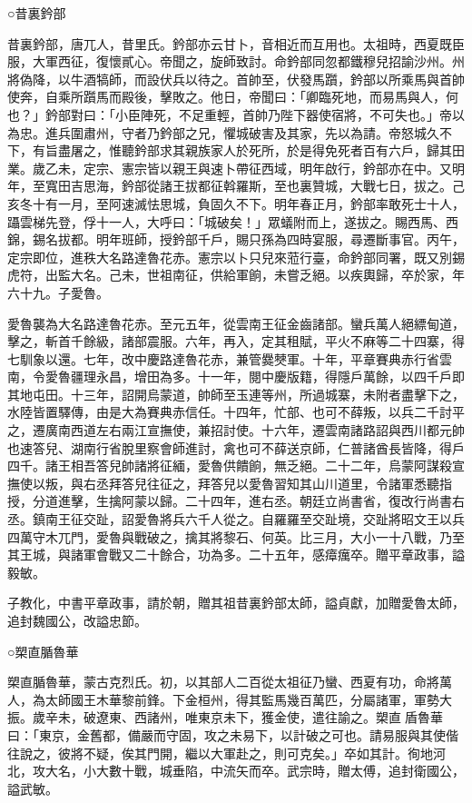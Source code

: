 \begin{pinyinscope}
 ○昔裏鈐部



 昔裏鈐部，唐兀人，昔里氏。鈐部亦云甘卜，音相近而互用也。太祖時，西夏既臣服，大軍西征，復懷貳心。帝聞之，旋師致討。命鈐部同忽都鐵穆兒招諭沙州。州將偽降，以牛酒犒師，而設伏兵以待之。首帥至，伏發馬躓，鈐部以所乘馬與首帥使奔，自乘所躓馬而殿後，擊敗之。他日，帝聞曰：「卿臨死地，而易馬與人，何也？」鈐部對曰：「小臣陣死，不足重輕，首帥乃陛下器使宿將，不可失也。」帝以為忠。進兵圍肅州，守者乃鈐部之兄，懼城破害及其家，先以為請。帝怒城久不下，有旨盡屠之，惟聽鈐部求其親族家人於死所，於是得免死者百有六戶，歸其田業。歲乙未，定宗、憲宗皆以親王與速卜帶征西域，明年啟行，鈐部亦在中。又明年，至寬田吉思海，鈐部從諸王拔都征斡羅斯，至也裏贊城，大戰七日，拔之。己亥冬十有一月，至阿速滅怯思城，負固久不下。明年春正月，鈐部率敢死士十人，躡雲梯先登，俘十一人，大呼曰：「城破矣！」眾蟻附而上，遂拔之。賜西馬、西錦，錫名拔都。明年班師，授鈐部千戶，賜只孫為四時宴服，尋遷斷事官。丙午，定宗即位，進秩大名路達魯花赤。憲宗以卜只兒來蒞行臺，命鈐部同署，既又別錫虎符，出監大名。己未，世祖南征，供給軍餉，未嘗乏絕。以疾輿歸，卒於家，年六十九。子愛魯。



 愛魯襲為大名路達魯花赤。至元五年，從雲南王征金齒諸部。蠻兵萬人絕縹甸道，擊之，斬首千餘級，諸部震服。六年，再入，定其租賦，平火不麻等二十四寨，得七馴象以還。七年，改中慶路達魯花赤，兼管爨僰軍。十年，平章賽典赤行省雲南，令愛魯疆理永昌，增田為多。十一年，閱中慶版籍，得隱戶萬餘，以四千戶即其地屯田。十三年，詔開烏蒙道，帥師至玉連等州，所過城寨，未附者盡擊下之，水陸皆置驛傳，由是大為賽典赤信任。十四年，忙部、也可不薛叛，以兵二千討平之，遷廣南西道左右兩江宣撫使，兼招討使。十六年，遷雲南諸路詔與西川都元帥也速答兒、湖南行省脫里察會師進討，禽也可不薛送京師，仁普諸酋長皆降，得戶四千。諸王相吾答兒帥諸將征緬，愛魯供饋餉，無乏絕。二十二年，烏蒙阿謀殺宣撫使以叛，與右丞拜答兒往征之，拜答兒以愛魯習知其山川道里，令諸軍悉聽指授，分道進擊，生擒阿蒙以歸。二十四年，進右丞。朝廷立尚書省，復改行尚書右丞。鎮南王征交趾，詔愛魯將兵六千人從之。自羅羅至交趾境，交趾將昭文王以兵四萬守木兀門，愛魯與戰破之，擒其將黎石、何英。比三月，大小一十八戰，乃至其王城，與諸軍會戰又二十餘合，功為多。二十五年，感瘴癘卒。贈平章政事，謚毅敏。



 子教化，中書平章政事，請於朝，贈其祖昔裏鈐部太師，謚貞獻，加贈愛魯太師，追封魏國公，改謚忠節。



 ○槊直腯魯華



 槊直腯魯華，蒙古克烈氏。初，以其部人二百從太祖征乃蠻、西夏有功，命將萬人，為太師國王木華黎前鋒。下金桓州，得其監馬幾百萬匹，分屬諸軍，軍勢大振。歲辛未，破遼東、西諸州，唯東京未下，獲金使，遣往諭之。槊直盾魯華曰：「東京，金舊都，備嚴而守固，攻之未易下，以計破之可也。請易服與其使偕往說之，彼將不疑，俟其門開，繼以大軍赴之，則可克矣。」卒如其計。徇地河北，攻大名，小大數十戰，城垂陷，中流矢而卒。武宗時，贈太傅，追封衛國公，謚武敏。




\end{pinyinscope}
